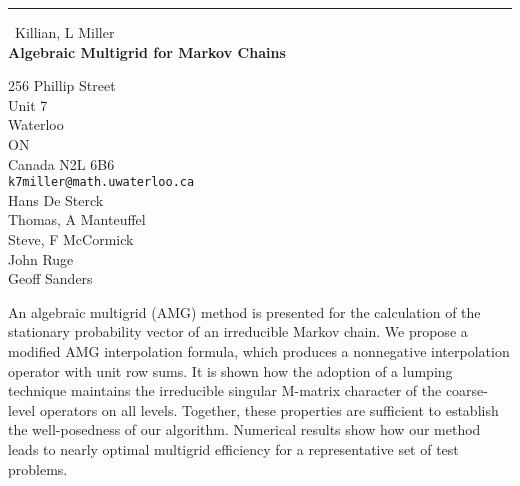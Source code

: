 \documentclass{report}
\begin{document}
\begin{center}
\rule{6in}{1pt} \
{\large Killian, L Miller \\
{\bf Algebraic Multigrid for Markov Chains}}

256 Phillip Street \\ Unit 7 \\ Waterloo \\ ON \\ Canada N2L 6B6
\\
{\tt k7miller@math.uwaterloo.ca}\\
Hans De Sterck\\
Thomas, A Manteuffel\\
Steve, F McCormick\\
John Ruge\\
Geoff Sanders\end{center}

An algebraic multigrid (AMG) method is presented for the calculation of
the stationary probability vector of an irreducible Markov chain. We
propose a modified AMG interpolation formula, which produces a
nonnegative interpolation operator with unit row sums. It is shown how
the adoption of a lumping technique maintains the irreducible singular
M-matrix character of the coarse-level operators on all levels. Together,
these properties are sufficient to establish the well-posedness of our
algorithm. Numerical results show how our method leads to nearly optimal
multigrid efficiency for a representative set of test problems.
\end{document}
